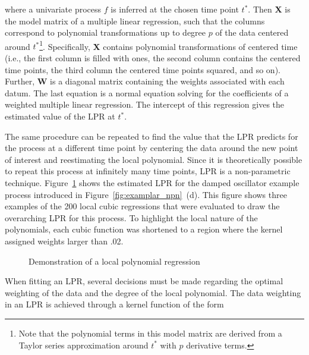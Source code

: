 \documentclass[man, floatsintext]{apa7}
\begin{document}
\noindent where a univariate process $f$ is inferred at the
chosen time point $t^*$. Then \textbf{X} is the model matrix of a multiple
linear regression, such that the columns correspond to polynomial
transformations up to degree $p$ of the data centered around
$t^*$\footnote{Note
  that the polynomial terms in this model matrix are derived from a Taylor
  series approximation around $t^*$ with $p$ derivative terms.}. Specifically,
\textbf{X} contains polynomial transformations of centered time (i.e., the
first column is filled with ones, the second column contains the centered time
points, the third column the centered time points squared, and so on). Further,
\textbf{W} is a diagonal matrix containing the weights associated with each
datum. The last equation is a normal equation solving for the coefficients of a
weighted multiple linear regression. The intercept of this regression
gives the estimated value of the LPR at $t^*$.

The same procedure can be repeated to find the value that the LPR predicts for
the process at a different time point by centering the data around the new
point of interest and reestimating the local polynomial. Since it is
theoretically possible to repeat this process at infinitely many time points,
LPR is a non-parametric technique. Figure~\ref{fig:locpol_dem} shows the
estimated LPR for the damped oscillator example process introduced in
Figure~\ref{fig:examplar_npn}~(d). This figure shows three examples of the 200
local cubic regressions that were evaluated to draw the overarching LPR for
this process. To highlight the local nature of the polynomials, each cubic
function was shortened to a region where the kernel assigned weights larger
than .02.

\begin{figure}[!t]
  \caption{Demonstration of a local polynomial regression}
  \label{fig:locpol_dem}
\end{figure}

When fitting an LPR, several decisions must be made regarding the optimal
weighting of the data and the degree of the local polynomial. The data
weighting in an LPR is achieved through a kernel function of the form
\end{document}
